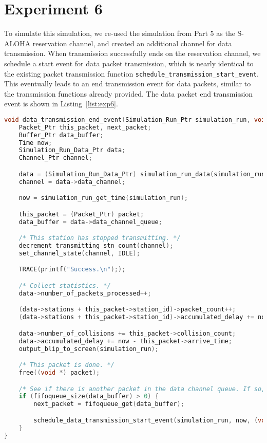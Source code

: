 \section*{Experiment 6}

To simulate this simulation, we re-used the simulation from Part 5 as the S-ALOHA reservation channel, and created an additional channel for data transmission. When transmission successfully ends on the reservation channel, we schedule a start event for data packet transmission, which is nearly identical to the existing packet transmission function \texttt{schedule\_transmission\_start\_event}. This eventually leads to an end transmission event for data packets, similar to the transmission functions already provided. The data packet end transmission event is shown in Listing~\ref{list:exp6}.

\begin{lstlisting}[language=c,caption=Data Packet Transmission End Event, label=list:exp6]
void data_transmission_end_event(Simulation_Run_Ptr simulation_run, void *packet) {
	Packet_Ptr this_packet, next_packet;
	Buffer_Ptr data_buffer;
	Time now;
	Simulation_Run_Data_Ptr data;
	Channel_Ptr channel;

	data = (Simulation_Run_Data_Ptr) simulation_run_data(simulation_run);
	channel = data->data_channel;

	now = simulation_run_get_time(simulation_run);

	this_packet = (Packet_Ptr) packet;
	data_buffer = data->data_channel_queue;

	/* This station has stopped transmitting. */
	decrement_transmitting_stn_count(channel);
	set_channel_state(channel, IDLE);

	TRACE(printf("Success.\n"););

	/* Collect statistics. */
	data->number_of_packets_processed++;

	(data->stations + this_packet->station_id)->packet_count++;
	(data->stations + this_packet->station_id)->accumulated_delay += now - this_packet->arrive_time;

	data->number_of_collisions += this_packet->collision_count;
	data->accumulated_delay += now - this_packet->arrive_time;
	output_blip_to_screen(simulation_run);

	/* This packet is done. */
	free((void *) packet);

	/* See if there is another packet in the data channel queue. If so, enable it for transmission. We will transmit immediately. */
	if (fifoqueue_size(data_buffer) > 0) {
		next_packet = fifoqueue_get(data_buffer);

		schedule_data_transmission_start_event(simulation_run, now, (void *) next_packet);
	}
}
\end{lstlisting}

